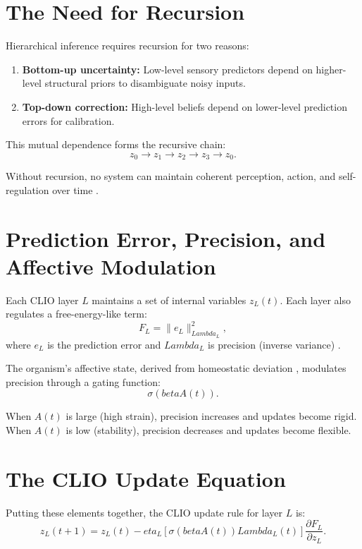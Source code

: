 \documentclass[12pt,oneside]{book}
\theoremstyle{plain}
\theoremstyle{definition}
\let\citep\parencite
\def\beta{beta}%
\def\eta{eta}%
\def\Lambda{Lambda}%
\begin{document}
\section{The Need for Recursion}

Hierarchical inference requires recursion for two reasons:

\begin{enumerate}
    \item \textbf{Bottom-up uncertainty:}
    Low-level sensory predictors depend on higher-level structural priors to
    disambiguate noisy inputs.

    \item \textbf{Top-down correction:}
    High-level beliefs depend on lower-level prediction errors for calibration.
\end{enumerate}

This mutual dependence forms the recursive chain:
\[
z_0 \rightarrow z_1 \rightarrow z_2 \rightarrow z_3 \rightarrow z_0.
\]

Without recursion, no system can maintain coherent perception, action, and
self-regulation over time \citep{friston2017active}.

\section{Prediction Error, Precision, and Affective Modulation}

Each CLIO layer $L$ maintains a set of internal variables $z_L(t)$.
Each layer also regulates a free-energy-like term:
\[
F_L = \|e_L\|^2_{\Lambda_L},
\]
where $e_L$ is the prediction error and $\Lambda_L$ is precision (inverse
variance) \citep{friston2010freeenergy}.

The organism's affective state, derived from homeostatic deviation
\citep{solms2021hidden}, modulates precision through a gating function:
\[
\sigma(\beta A(t)).
\]

When $A(t)$ is large (high strain), precision increases and updates become
rigid.
When $A(t)$ is low (stability), precision decreases and updates become flexible.

\section{The CLIO Update Equation}

Putting these elements together, the CLIO update rule for layer $L$ is:
\[
z_L(t+1)
=
z_L(t)
-
\eta_L
\left[
    \sigma(\beta A(t)) \Lambda_L(t)
\right]
\frac{\partial F_L}{\partial z_L}.
\]
\end{document}
